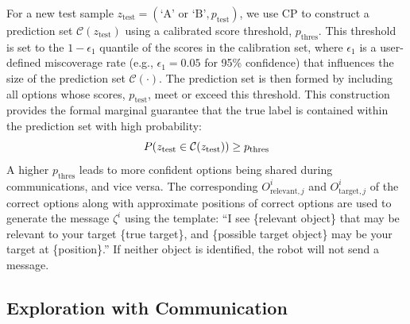 For a new test sample \( z_{\text{test}} = (\text{`A' or `B'}, p_{\text{test}}) \), we use CP to construct a prediction set $\mathcal{C}(z_{\text{test}})$ using a calibrated score threshold, $p_{\text{thres}}$. 
This threshold is set to the $1-\epsilon_1$ quantile of the scores in the calibration set, where \( \epsilon_1 \) is a user-defined miscoverage rate (e.g., $\epsilon_1=0.05$ for 95\% confidence) that influences the size of the prediction set \( \mathcal{C}(\cdot) \). 
The prediction set is then formed by including all options whose scores, $p_{\text{test}}$, meet or exceed this threshold. 
This construction provides the formal marginal guarantee that the true label is contained within the prediction set with high probability:
\vspace{-0.15cm}
\begin{equation}
    P(z_{\text{test}} \in \mathcal{C}(z_{\text{test}})) \geq p_{\text{thres}}
    \vspace{-0.15cm}
\end{equation}
A higher $p_{\text{thres}}$ leads to more confident options being shared during communications, and vice versa.
The corresponding $O^{i
}_{\text{relevant},j}$ and $O^{i}_{\text{target},j}$ of the correct options along with approximate positions of correct options are used to generate the message \( \zeta^{i} \) using the template: ``I see \{relevant object\} that may be relevant to
your target \{true target\}, and \{possible target object\} may be your target at \{position\}.'' If neither object is identified, the robot will not send a message.

\subsection{Exploration with Communication}\label{sec:baseline_method}

